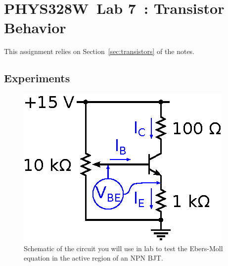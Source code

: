 \documentclass[11pt]{article}
\newcommand{\COURSE}{PHYS328W}
\newcommand{\LABNUM}{7}
\newcommand{\TITLE}{Transistor Behavior}
\begin{document}
\thispagestyle{empty}

\section*{\COURSE\ Lab \LABNUM\ : \TITLE}

This assignment relies on Section~\ref{sec:transistors} of the notes.

\subsection*{Experiments}

\begin{figure}[ht]
  \begin{center}
    \includegraphics{ebersmollcircuit.eps}
    \caption{Schematic of the circuit you will use in lab to
      test the Ebers-Moll equation in the active region of an NPN
      BJT.}
    \label{fig:ebersmollcircuitlab}
  \end{center}
\end{figure}
\end{document}
